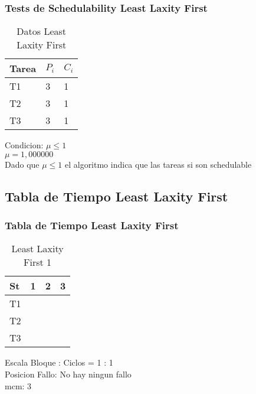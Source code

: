 \documentclass[xcolor=table]{beamer}
\begin{document}
\begin{frame} 
\frametitle{Tests de Schedulability  Least Laxity First } 
\begin{table} 
\centering 
\begin{tabular}{|l|l|l|} 
\hline 
\cellcolor{lightgray}Tarea & \cellcolor{lightgray}$P_i$ & \cellcolor{lightgray}$C_i$ \\ \hline 
T1   & 3  &  1\\ \hline 
T2   & 3  &  1\\ \hline 
T3   & 3  &  1\\ \hline 
\end{tabular} 
\caption{Datos  Least Laxity First } 
\end{table} 
Condicion: $\mu \leq 1$ \\ 
$\mu =  1,000000 $ \\ 
Dado que $\mu \leq 1$ el algoritmo indica que las tareas si son schedulable \\ 
\end{frame} 

\subsection{Tabla de Tiempo  Least Laxity First } 

\begin{frame} 
\frametitle{Tabla de Tiempo  Least Laxity First } 
\begin{table} 
\centering 
\begin{tabular}{|l|l|l|l|} 
\hline 
St &  1 \cellcolor{green} &  2 \cellcolor{green} &  3 \cellcolor{green} \\ \hline 
T1 & & & \cellcolor{blue} \\ \hline 
T2 & & \cellcolor{purple} & \\ \hline 
T3 & \cellcolor{cyan} & & \\ \hline 
\end{tabular} 
\caption{ Least Laxity First 1 } 
\end{table} 
Escala Bloque : Ciclos = 1 : 1 \\ 
Posicion Fallo: No hay ningun fallo \\ 
mcm:  3 \\ 
\end{frame} 

\end{document}

